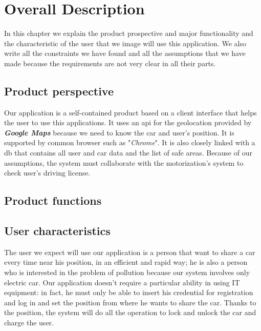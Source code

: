 \section{Overall Description} \label{sec:description}
In this chapter we explain the product prospective and major functionality and the characteristic of the user that we image will use this application. We also write all the constraints we have found and all the assumptions that we have made because the requirements are not very clear in all their parts. 

\subsection{Product perspective} \label{subsec:prod_persp}
Our application is a self-contained product based on a client interface that helps the user to use this applications. It uses an \acs{api} for the geolocation provided by \emph{\textbf{Google Maps}} because we need to know the car and user's position. It is supported by common browser such as "\emph{Chrome}". It is also closely linked with a \acs{db} that contains all user and car data and the list of safe areas. Because of our assumptions, the system must collaborate with the motorization's system to check user's driving license.



\subsection{Product functions} \label{subsec:prod_funct}


\subsection{User characteristics} \label{subsec:user_char}
The user we expect will use our application is a person that want to share a car every time near his position, in an efficient and rapid way; he is also a person who is interested in the problem of pollution because our system involves only electric car. Our application doesn't require a particular ability in using IT equipment: in fact, he must only be able to insert his credential for registration and log in and set the position from where he wants to share the car. Thanks to the position, the system will do all the operation to lock and unlock the car and charge the user.


